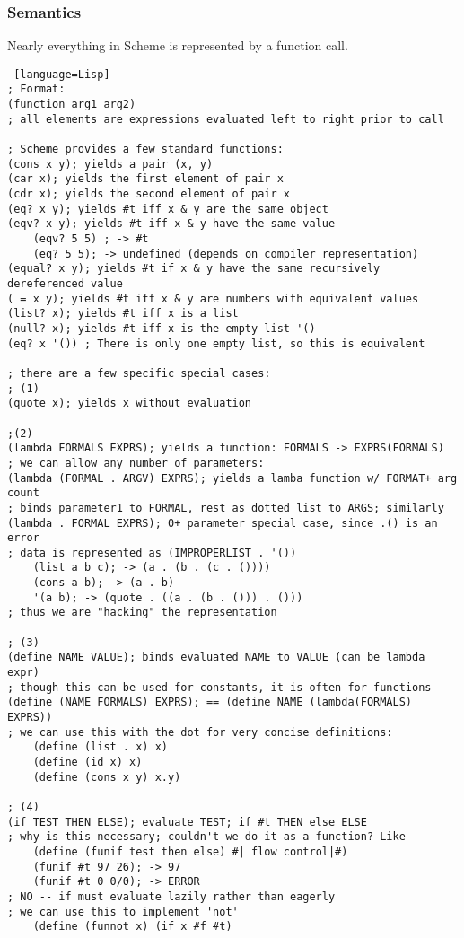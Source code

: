\documentclass[../../lecture_notes.tex]{subfiles}
\begin{document}
\subsubsection*{Semantics}
\noindent Nearly everything in Scheme is represented by a function call.
\begin{lstlisting} [language=Lisp]
; Format:
(function arg1 arg2)
; all elements are expressions evaluated left to right prior to call
 
; Scheme provides a few standard functions:
(cons x y); yields a pair (x, y)
(car x); yields the first element of pair x
(cdr x); yields the second element of pair x
(eq? x y); yields #t iff x & y are the same object
(eqv? x y); yields #t iff x & y have the same value
	(eqv? 5 5) ; -> #t
	(eq? 5 5); -> undefined (depends on compiler representation)
(equal? x y); yields #t if x & y have the same recursively dereferenced value
( = x y); yields #t iff x & y are numbers with equivalent values
(list? x); yields #t iff x is a list
(null? x); yields #t iff x is the empty list '()
(eq? x '()) ; There is only one empty list, so this is equivalent
 
; there are a few specific special cases:
; (1)
(quote x); yields x without evaluation
 
;(2)
(lambda FORMALS EXPRS); yields a function: FORMALS -> EXPRS(FORMALS)
; we can allow any number of parameters:
(lambda (FORMAL . ARGV) EXPRS); yields a lamba function w/ FORMAT+ arg count
; binds parameter1 to FORMAL, rest as dotted list to ARGS; similarly
(lambda . FORMAL EXPRS); 0+ parameter special case, since .() is an error
; data is represented as (IMPROPERLIST . '())
	(list a b c); -> (a . (b . (c . ())))
	(cons a b); -> (a . b)
	'(a b); -> (quote . ((a . (b . ())) . ()))
; thus we are "hacking" the representation
 
; (3)
(define NAME VALUE); binds evaluated NAME to VALUE (can be lambda expr)
; though this can be used for constants, it is often for functions
(define (NAME FORMALS) EXPRS); == (define NAME (lambda(FORMALS) EXPRS))
; we can use this with the dot for very concise definitions:
	(define (list . x) x)
	(define (id x) x)
	(define (cons x y) x.y)
 
; (4)
(if TEST THEN ELSE); evaluate TEST; if #t THEN else ELSE
; why is this necessary; couldn't we do it as a function? Like
	(define (funif test then else) #| flow control|#)
	(funif #t 97 26); -> 97
	(funif #t 0 0/0); -> ERROR
; NO -- if must evaluate lazily rather than eagerly
; we can use this to implement 'not'
	(define (funnot x) (if x #f #t)
 

\end{lstlisting}
\end{document}
